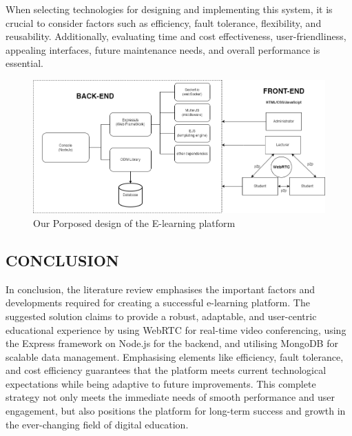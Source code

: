 \documentclass[a4paper,12pt]{article}  %
\begin{document}
When selecting technologies for designing and implementing this system, it is crucial to consider factors such as efficiency, fault tolerance, flexibility, and reusability. Additionally, evaluating time and cost effectiveness, user-friendliness, appealing interfaces, future maintenance needs, and overall performance is essential.\\

\begin{figure}[H]
  \centering
  \includegraphics[width=1\textwidth]{figures/proposed.png}
  \caption{Our Porposed design of the E-learning platform}
\end{figure}

\subsection{CONCLUSION}
In conclusion, the literature review emphasises the important factors and developments required for creating a successful e-learning platform. The suggested solution claims to provide a robust, adaptable, and user-centric educational experience by using WebRTC for real-time video conferencing, using the Express framework on Node.js for the backend, and utilising MongoDB for scalable data management. Emphasising elements like efficiency, fault tolerance, and cost efficiency guarantees that the platform meets current technological expectations while being adaptive to future improvements. This complete strategy not only meets the immediate needs of smooth performance and user engagement, but also positions the platform for long-term success and growth in the ever-changing field of digital education.\\
\newpage



\end{document}
